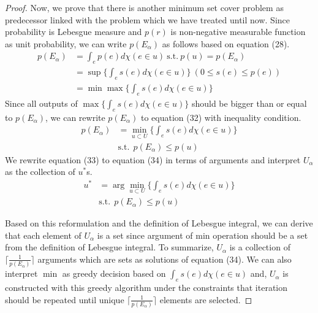 \begin{proof}
Now, we prove that there is another minimum set cover problem as predecessor linked with the problem which we have treated until now.
Since probability is Lebesgue measure and $p(r)$ is non-negative measurable function as unit probability, 
we can write $p({E_{\alpha}})$ as follows based on equation (28).
\begin{equation}
    \label{extension_msc}
    \begin{split}
        p({E_{\alpha}}) &= \int_e p(e) d\chi(e \in u)\  \textrm{s.t.}\ p(u)=p({E_{\alpha}})\\
                       &=\sup\{\int_{e}s(e)d\chi(e \in u) \}\ (0 \le s(e) \le p(e)) \\
                       &=\min\max\{ \int_{e}s(e) d\chi(e \in u) \} 
    \end{split}
\end{equation}
Since all outputs of $\max\{ \int_{e}s(e) d\chi(e \in u) \}$ should be bigger than 
or equal to $p({E_{\alpha}})$, 
we can rewrite $p(E_{\alpha})$ to equation (32) with inequality condition.
\begin{equation}
    \label{refined_extension_msc}
    \begin{split}
        p(E_{\alpha}) &= \min_{u \subset U}\{ \int_{e}s(e) d\chi(e \in u) \} \\
        &\textrm{s.t.}\ \ p({E_{\alpha}}) \le p(u)
    \end{split}
\end{equation}
We rewrite equation (33) to equation (34) in terms of arguments
and interpret $U_{\alpha}$ as the collection of $u^{\ast}$s.
\begin{equation}
    \label{element_predec_msc}
    \begin{split}
        u^{\ast} &= \arg\min_{u \subset U}\{ \int_{e}s(e) d\chi(e \in u) \} \\
        &\textrm{s.t.}\ \ p({E_{\alpha}}) \le p(u)
    \end{split}
\end{equation}

Based on this reformulation and the definition of Lebesgue integral, we can derive that each element of $U_{\alpha}$ is a set
since argument of min operation should be a set from the definition of Lebesgue integral.
To summarize, $U_\alpha$ is a collection of $\lceil \frac{1}{p(E_{\alpha})} \rceil$ arguments 
which are sets as solutions of equation (34).
We can also interpret $\min$ as greedy decision based on $\int_{e}s(e) d\chi(e \in u)$ and,
$U_{\alpha}$ is constructed with this greedy algorithm under the constraints that iteration should be repeated  
until unique $\lceil \frac{1}{p({E_{\alpha}})} \rceil$ elements are selected.


\end{proof}
